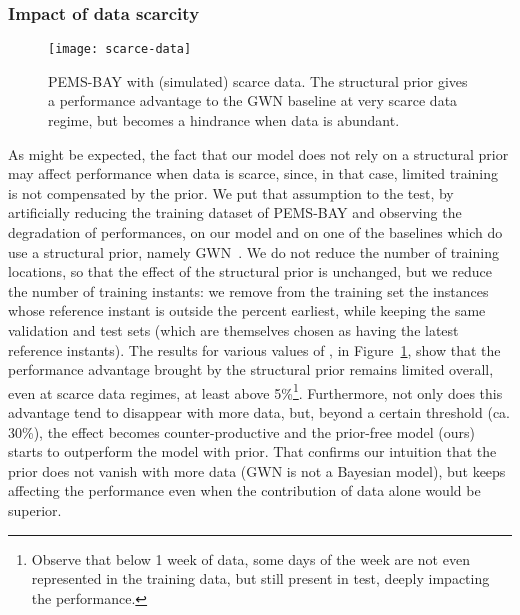 \documentclass[a4paper]{article}
\begin{document}
\subsubsection{Impact of data scarcity}
\begin{figure}
\begin{center}
\texttt{[image: scarce-data]}
\end{center}
\caption{\label{fig:scarce-data}PEMS-BAY with (simulated) scarce data. The structural prior gives a performance advantage to the GWN baseline at very scarce data regime, but becomes a hindrance when data is abundant.}
\end{figure}
As might be expected, the fact that our model does not rely on a structural prior may affect performance when data is scarce, since, in that case, limited training is not compensated by the prior. We put that assumption to the test, by artificially reducing the training dataset of PEMS-BAY and observing the degradation of performances, on our model and on one of the baselines which do use a structural prior, namely GWN~\cite{wu_graph_2019}. We do not reduce the number of training locations, so that the effect of the structural prior is unchanged, but we reduce the number of training instants: we remove from the training set the instances whose reference instant is outside the  percent earliest, while keeping the same validation and test sets (which are themselves chosen as having the latest reference instants). The results for various values of , in Figure~\ref{fig:scarce-data}, show that the performance advantage brought by the structural prior remains limited overall, even at scarce data regimes, at least above 5\%\footnote{Observe that below 1 week of data, some days of the week are not even represented in the training data, but still present in test, deeply impacting the performance.}. Furthermore, not only does this advantage tend to disappear with more data, but, beyond a certain threshold (ca. 30\%), the effect becomes counter-productive and the prior-free model (ours) starts to outperform the model with prior. That confirms our intuition that the prior does not vanish with more data (GWN is not a Bayesian model), but keeps affecting the performance even when the contribution of data alone would be superior.
\end{document}
